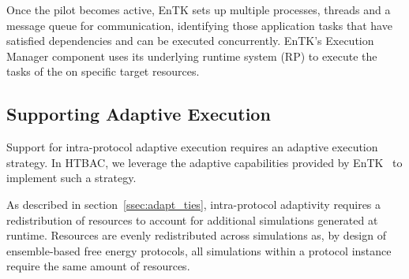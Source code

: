 Once the pilot becomes active, EnTK sets up multiple processes, threads and a
message queue for communication, identifying those application tasks that
have satisfied dependencies and can be executed concurrently. EnTK's
Execution Manager component uses its underlying runtime system (RP) to
execute the tasks of the on specific target resources.





\subsection{Supporting Adaptive Execution}\label{ssec:adaptive_execution}

Support for intra-protocol adaptive execution requires an adaptive execution
strategy. In HTBAC, we leverage the adaptive capabilities provided by
EnTK~\cite{adaptivebiomolecular} to implement such a strategy. 

As described in section~\ref{ssec:adapt_ties}, intra-protocol adaptivity
requires a redistribution of resources to account for additional simulations
generated at runtime. Resources are evenly redistributed across simulations
as, by design of ensemble-based free energy protocols, all simulations within
a protocol instance require the same amount of resources.

